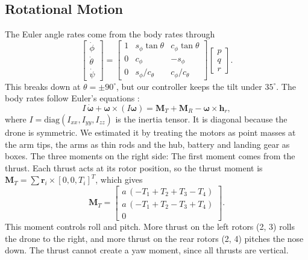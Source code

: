 \documentclass[11pt]{article}
\begin{document}
\subsection{Rotational Motion}
The Euler angle rates come from the body rates through
\begin{equation}
\begin{bmatrix}\dot\phi\\ \dot\theta\\ \dot\psi\end{bmatrix} =
\begin{bmatrix}
1 & s_\phi \tan\theta & c_\phi \tan\theta\\
0 & c_\phi & -s_\phi\\
0 & s_\phi/c_\theta & c_\phi/c_\theta
\end{bmatrix}
\begin{bmatrix}p\\ q\\ r\end{bmatrix}.
\end{equation}
This breaks down at $\theta = \pm 90^\circ$, but our controller keeps the tilt under $35^\circ$.
The body rates follow Euler's equations \cite[p.~34]{ae352ch6}:
\begin{equation}
I\,\dot{\boldsymbol{\omega}} + \boldsymbol{\omega}\times(I\boldsymbol{\omega}) = \mathbf{M}_T + \mathbf{M}_R - \boldsymbol{\omega}\times\mathbf{h}_r,
\label{eq:euler}
\end{equation}
where $I = \mathrm{diag}(I_{xx}, I_{yy}, I_{zz})$ is the inertia tensor. It is diagonal because the drone is symmetric. We estimated it by treating the motors as point masses at the arm tips, the arms as thin rods and the hub, battery and landing gear as boxes. 
\newline
The three moments on the right side: The first moment comes from the thrust. Each thrust acts at its rotor position, so the thrust moment is $\mathbf{M}_T = \sum \mathbf{r}_i \times [0,0,T_i]^T$, which gives
\begin{equation}
\mathbf{M}_T = \begin{bmatrix} a\,(-T_1 + T_2 + T_3 - T_4)\\ a\,(-T_1 + T_2 - T_3 + T_4)\\ 0 \end{bmatrix}.
\end{equation}
This moment controls roll and pitch. More thrust on the left rotors (2, 3) rolls the drone to the right, and more thrust on the rear rotors (2, 4) pitches the nose down. The thrust cannot create a yaw moment, since all thrusts are vertical.\\
\end{document}
